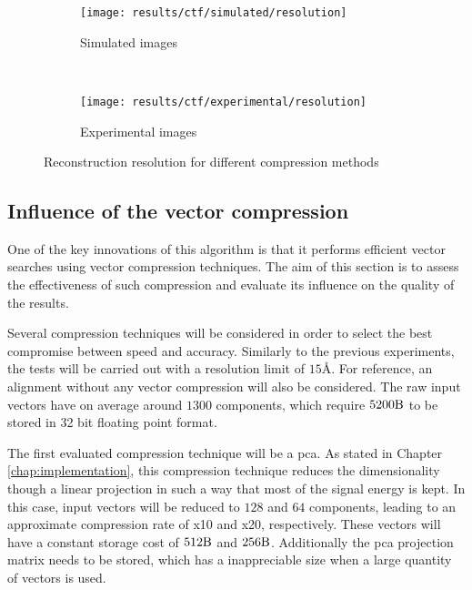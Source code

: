 \documentclass[../main.tex]{subfiles}
\begin{document}
\begin{figure}[htbp]
    \centering
    \begin{subfigure}[b]{.8\textwidth}
         \centering
         \texttt{[image: results/ctf/simulated/resolution]}
         \caption{Simulated images}
    \end{subfigure}\\
    \vspace{2em}
    \begin{subfigure}[b]{.8\textwidth}
         \centering
         \texttt{[image: results/ctf/experimental/resolution]}
         \caption{Experimental images}
    \end{subfigure}
    \caption{Reconstruction resolution for different compression methods}
    \label{fig:5:ctf_resolution}
\end{figure}

\subsection{Influence of the vector compression}
One of the key innovations of this algorithm is that it performs efficient vector searches using vector compression techniques. The aim of this section is to assess the effectiveness of such compression and evaluate its influence on the quality of the results.

Several compression techniques will be considered in order to select the best compromise between speed and accuracy. Similarly to the previous experiments, the tests will be carried out with a resolution limit of $15 \si{\angstrom}$. For reference, an alignment without any vector compression will also be considered. The raw input vectors have on average around $1300$ components, which require $5200 \si{\byte}$ to be stored in 32 bit floating point format.

The first evaluated compression technique will be a \gls{pca}. As stated in Chapter \ref{chap:implementation}, this compression technique reduces the dimensionality though a linear projection in such a way that most of the signal energy is kept. In this case, input vectors will be reduced to $128$ and $64$ components, leading to an approximate compression rate of x10 and x20, respectively. These vectors will have a constant storage cost of $512\si{\byte}$ and $256\si{\byte}$. Additionally the \gls{pca} projection matrix needs to be stored, which has a inappreciable size when a large quantity of vectors is used.
\end{document}
